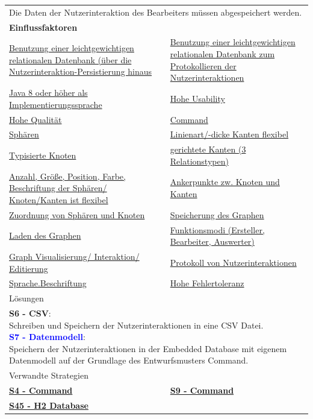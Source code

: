 \documentclass[enabledeprecatedfontcommands,fontsize=11pt,paper=a4,twoside]{scrartcl}
\newcounter{one}
\newcommand{\cb}[1]{{\textcolor{blue}{#1}}}
\begin{document}
\newpage
\begin{tabular} {|p{8cm} p{8cm}|}
	\hline
	\rowcolor{prob}\multicolumn{2}{|l|}{\parbox{16cm}{\textbf{03: Datensicherung/Persistenz der Nutzerinteraktionen}}} \\  \hline\hline 
	\multicolumn{2}{|l|}{\parbox{16cm}{Die Daten der Nutzerinteraktion des Bearbeiters müssen abgespeichert werden.}}\rule{0pt}{1ex}\\  \hline
	\multicolumn{2}{|l|}{\textbf{Einflussfaktoren}}\\
	\hyperlink {e}{Benutzung einer leichtgewichtigen relationalen Datenbank (über die Nutzerinteraktion-Persistierung hinaus} & 
	\hyperlink {d}{Benutzung einer leichtgewichtigen relationalen Datenbank zum Protokollieren der Nutzerinteraktionen}\\ 
	\hyperlink{b}{Java 8 oder höher als Implementierungssprache} & 
	\hyperlink {g}{Hohe Usability}\\
	\hyperlink {h}{Hohe Qualität} &
	\hyperlink {i}{Command} \\
	\hyperlink {n}{Sphären} &
	\hyperlink {o}{Linienart/-dicke Kanten flexibel} \\
	\hyperlink {p}{Typisierte Knoten} &
	\hyperlink {q}{gerichtete Kanten (3 Relationstypen)} \\
	\hyperlink {r}{Anzahl, Größe, Position, Farbe, Beschriftung der Sphären/ Knoten/Kanten ist flexibel} &
	\hyperlink {s}{Ankerpunkte zw. Knoten und Kanten} \\
	\hyperlink {t}{Zuordnung von Sphären und Knoten} &
	\hyperlink {v}{Speicherung des Graphen} \\
	\hyperlink {w}{Laden des Graphen} &
	\hyperlink {z}{Funktionsmodi (Ersteller, Bearbeiter, Auswerter)} \\
	\hyperlink {aa}{Graph Visualisierung/ Interaktion/ Editierung} &
	\hyperlink {bb}{Protokoll von Nutzerinteraktionen} \\
	\hyperlink {hh}{Sprache.Beschriftung} &
	\hyperlink {tt}{Hohe Fehlertoleranz} 
	\\ \hline
	\multicolumn{2}{|l|}{Lösungen} \\
	\multicolumn{2}{|l|}{\parbox{16cm}{
			\textbf{S6 - CSV}: \\
			Schreiben und Speichern der Nutzerinteraktionen in eine CSV Datei. \\
			\textbf{\cb{\hypertarget{aaa}{S7 - Datenmodell}}}: \\
			Speichern der Nutzerinteraktionen in der Embedded Database mit eigenem Datenmodell auf der Grundlage des Entwurfsmusters Command.}}\\ 
	\hline
	\multicolumn{2}{|l|}{Verwandte Strategien} \\
	\textbf{\hyperlink {zz}{S4 - Command}} &
	\textbf{\hyperlink {command}{S9 - Command}} \\
	\textbf{\hyperlink {ppp}{S45 - H2 Database}}&
	\\\hline
\end{tabular}\\ \\ \\
\end{document}
